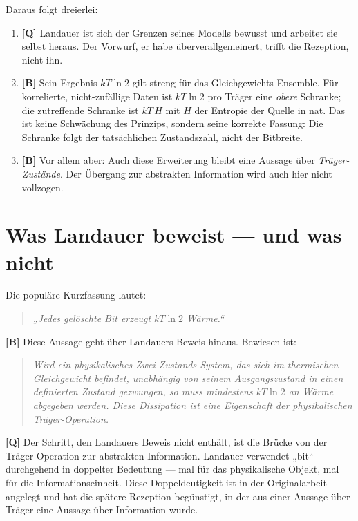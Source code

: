 Daraus folgt dreierlei:

\begin{enumerate}[leftmargin=1.6em,itemsep=0.3em]
  \item \textbf{[Q]} Landauer ist sich der Grenzen seines Modells bewusst und arbeitet sie
        selbst heraus. Der Vorwurf, er habe überverallgemeinert, trifft die
        Rezeption, nicht ihn.
  \item \textbf{[B]} Sein Ergebnis $kT\ln 2$ gilt streng für das
        Gleichgewichts-Ensemble. Für korrelierte, nicht-zufällige Daten ist
        $kT\ln 2$ pro Träger eine \emph{obere} Schranke; die zutreffende Schranke
        ist $kT\,H$ mit $H$ der Entropie der Quelle in nat. Das ist keine
        Schwächung des Prinzips, sondern seine korrekte Fassung: Die Schranke
        folgt der tatsächlichen Zustandszahl, nicht der Bitbreite.
  \item \textbf{[B]} Vor allem aber: Auch diese Erweiterung bleibt eine Aussage über
        \emph{Träger-Zustände}. Der Übergang zur abstrakten Information wird auch
        hier nicht vollzogen.
\end{enumerate}

\section{Was Landauer beweist --- und was nicht}

Die populäre Kurzfassung lautet:

\begin{quote}
\emph{„Jedes gelöschte Bit erzeugt $kT\ln 2$ Wärme.“}
\end{quote}

\textbf{[B]} Diese Aussage geht über Landauers Beweis hinaus. Bewiesen ist:

\begin{quote}
\emph{Wird ein physikalisches Zwei-Zustands-System, das sich im thermischen
Gleichgewicht befindet, unabhängig von seinem Ausgangszustand in einen definierten
Zustand gezwungen, so muss mindestens $kT\ln 2$ an Wärme abgegeben werden. Diese
Dissipation ist eine Eigenschaft der physikalischen Träger-Operation.}
\end{quote}

\textbf{[Q]} Der Schritt, den Landauers Beweis nicht enthält, ist die Brücke von der
Träger-Operation zur abstrakten Information. Landauer verwendet „bit“ durchgehend
in doppelter Bedeutung --- mal für das physikalische Objekt, mal für die
Informationseinheit. Diese Doppeldeutigkeit ist in der Originalarbeit angelegt und
hat die spätere Rezeption begünstigt, in der aus einer Aussage über Träger eine
Aussage über Information wurde.

